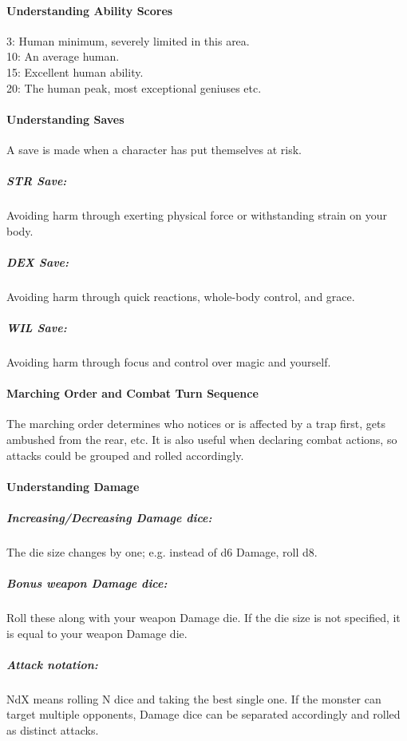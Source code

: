 \documentclass[itdr]{subfiles}
\begin{document}
\paragraph{Understanding Ability Scores}
3: Human minimum, severely limited in this area.\\
10: An average human.\\
15: Excellent human ability.\\
20: The human peak, most exceptional geniuses etc.

\vfill

\paragraph{Understanding Saves}
A save is made  when a character has put themselves at risk.

\subparagraph{STR Save:} Avoiding harm through exerting physical force or withstanding strain on your body.

\subparagraph{DEX Save:} Avoiding harm through quick reactions, whole-body control, and grace.

\subparagraph{WIL Save:} Avoiding harm through focus and control over magic and yourself.

\vfill
\break

\paragraph{Marching Order and Combat Turn Sequence}
The marching order determines who notices or is affected by a trap first, gets ambushed from the rear, etc. It is also useful when declaring combat actions, so attacks could be grouped and rolled accordingly.

\vfill

\paragraph{Understanding Damage}
\subparagraph{Increasing/Decreasing Damage dice:} The die size changes by one; e.g. instead of d6 Damage, roll d8.

\subparagraph{Bonus weapon Damage dice:} Roll these along with your weapon Damage die. If the die size is not \mbox{specified}, it is equal to your weapon Damage die.

\subparagraph{Attack notation:} NdX means rolling N dice and taking the best single one. If the monster can target multiple opponents, Damage dice can be separated accordingly and rolled as distinct attacks.
\end{document}
